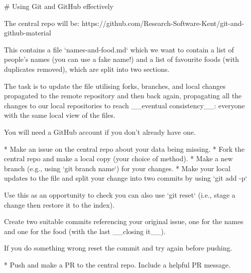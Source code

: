 # Using Git and GitHub effectively

The central repo will be: https://github.com/Research-Software-Kent/git-and-github-material

This contains a file `names-and-food.md` which we want to contain a list of people's names (you can use a fake name!) and a list of favourite foods (with duplicates removed), which are split into two sections.

The task is to update the file utilising forks, branches, and local changes propagated to the remote repository and then back again, propagating all the changes to our local repositories to reach __eventual consistency__: everyone with the same local view of the files.

You will need a GitHub account if you don't already have one.

* Make an issue on the central repo about your data being missing.
* Fork the central repo and make a local copy (your choice of method).
* Make a new branch (e.g., using `git branch name`) for your changes.
* Make your local updates to the file and split your change into two commits by using `git add -p`

Use this as an opportunity to check you can also use
 `git reset` (i.e., stage a change then restore it to the index).

Create two suitable commits referencing your original issue, one for the names and one for the food (with the last __closing it__).

If you do something wrong reset the commit and try again before pushing.

* Push and make a PR to the central repo. Include a helpful PR message.


